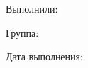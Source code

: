 \begin{titlepage}
\thispagestyle{empty}
\centering
\vspace*{34mm}
{\fontsize{22}{26}\selectfont\bfseries \ReportTitle\par}
\vspace{16pt}
{\fontsize{16}{20}\selectfont \ReportSubject\par}
{\fontsize{16}{20}\selectfont \ReportType\par}
\vspace{30pt}
\begin{flushleft}
Выполнили:\par
\ReportAuthors
\vspace{8pt}
Группа: \ReportGroup\par
\vspace{8pt}
Дата выполнения: \ReportDate\par
\end{flushleft}
\end{titlepage}
\setcounter{page}{2}
